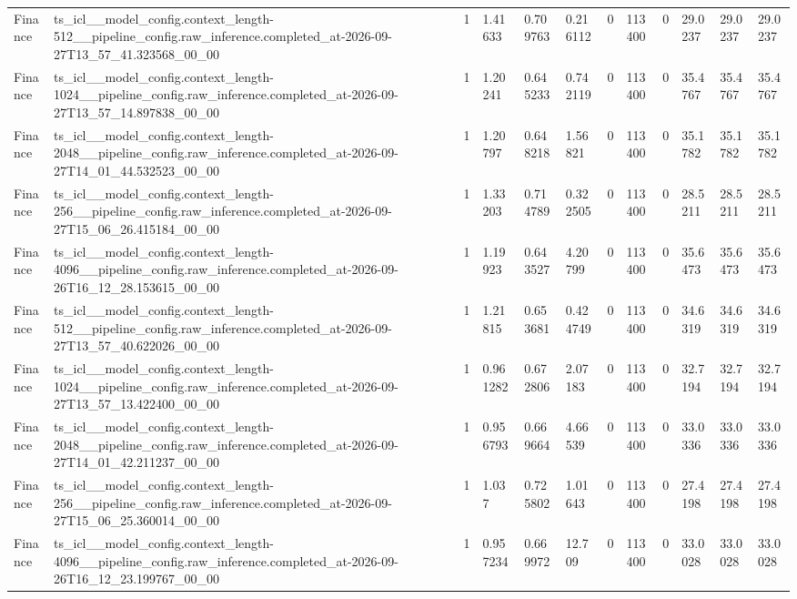 \begin{tabular}{llllllllllll}
Finance & ts\_icl\_\_model\_config.context\_length-512\_\_pipeline\_config.raw\_inference.completed\_at-2026-09-27T13\_57\_41.323568\_00\_00 & 1 & 1.41633 & 0.709763 & 0.216112 & 0 & 113400 & 0 & 29.0237 & 29.0237 & 29.0237 \\
Finance & ts\_icl\_\_model\_config.context\_length-1024\_\_pipeline\_config.raw\_inference.completed\_at-2026-09-27T13\_57\_14.897838\_00\_00 & 1 & 1.20241 & 0.645233 & 0.742119 & 0 & 113400 & 0 & 35.4767 & 35.4767 & 35.4767 \\
Finance & ts\_icl\_\_model\_config.context\_length-2048\_\_pipeline\_config.raw\_inference.completed\_at-2026-09-27T14\_01\_44.532523\_00\_00 & 1 & 1.20797 & 0.648218 & 1.56821 & 0 & 113400 & 0 & 35.1782 & 35.1782 & 35.1782 \\
Finance & ts\_icl\_\_model\_config.context\_length-256\_\_pipeline\_config.raw\_inference.completed\_at-2026-09-27T15\_06\_26.415184\_00\_00 & 1 & 1.33203 & 0.714789 & 0.322505 & 0 & 113400 & 0 & 28.5211 & 28.5211 & 28.5211 \\
Finance & ts\_icl\_\_model\_config.context\_length-4096\_\_pipeline\_config.raw\_inference.completed\_at-2026-09-26T16\_12\_28.153615\_00\_00 & 1 & 1.19923 & 0.643527 & 4.20799 & 0 & 113400 & 0 & 35.6473 & 35.6473 & 35.6473 \\
Finance & ts\_icl\_\_model\_config.context\_length-512\_\_pipeline\_config.raw\_inference.completed\_at-2026-09-27T13\_57\_40.622026\_00\_00 & 1 & 1.21815 & 0.653681 & 0.424749 & 0 & 113400 & 0 & 34.6319 & 34.6319 & 34.6319 \\
Finance & ts\_icl\_\_model\_config.context\_length-1024\_\_pipeline\_config.raw\_inference.completed\_at-2026-09-27T13\_57\_13.422400\_00\_00 & 1 & 0.961282 & 0.672806 & 2.07183 & 0 & 113400 & 0 & 32.7194 & 32.7194 & 32.7194 \\
Finance & ts\_icl\_\_model\_config.context\_length-2048\_\_pipeline\_config.raw\_inference.completed\_at-2026-09-27T14\_01\_42.211237\_00\_00 & 1 & 0.956793 & 0.669664 & 4.66539 & 0 & 113400 & 0 & 33.0336 & 33.0336 & 33.0336 \\
Finance & ts\_icl\_\_model\_config.context\_length-256\_\_pipeline\_config.raw\_inference.completed\_at-2026-09-27T15\_06\_25.360014\_00\_00 & 1 & 1.037 & 0.725802 & 1.01643 & 0 & 113400 & 0 & 27.4198 & 27.4198 & 27.4198 \\
Finance & ts\_icl\_\_model\_config.context\_length-4096\_\_pipeline\_config.raw\_inference.completed\_at-2026-09-26T16\_12\_23.199767\_00\_00 & 1 & 0.957234 & 0.669972 & 12.709 & 0 & 113400 & 0 & 33.0028 & 33.0028 & 33.0028 \\

\end{tabular}
